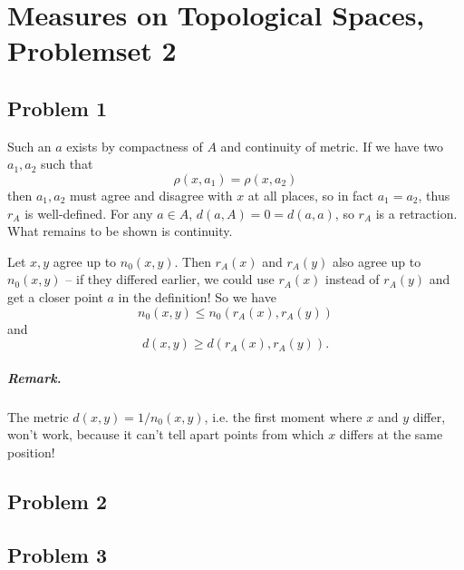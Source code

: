 \chapter{Measures on Topological Spaces, Problemset 2}

\section*{Problem 1}

Such an \( a \) exists by compactness of \( A \) and continuity of metric. If we have two \( a_1, a_2 \) such that 
\[ 
    \rho(x, a_1) = \rho(x, a_2) 
\]
then \( a_1, a_2 \) must agree and disagree with \( x \) at all places, so in fact \( a_1 = a_2 \), thus \( r_A \) is well-defined. For any \( a \in A \), \( d(a,A) = 0 = d(a,a) \), so \( r_A \) is a retraction. What remains to be shown is continuity.

Let \( x, y \) agree up to \( n_0(x,y) \). Then \( r_A(x) \) and \( r_A(y) \) also agree up to \( n_0(x,y) \) -- if they differed earlier, we could use \( r_A(x) \) instead of \( r_A(y) \) and get a closer point \( a \) in the definition! So we have
\[ 
    n_0(x, y) \leqslant n_0 \left( r_A(x), r_A(y) \right) 
\]
and
\[ 
    d(x,y) \geqslant d \left(  r_A(x), r_A(y) \right).
\]

\paragraph{Remark.} The metric \( d(x,y) = 1/n_0(x,y) \), i.e. the first moment where \( x \) and \( y \) differ, won't work, because it can't tell apart points from which \( x \) differs at the same position!

\section*{Problem 2}

\section*{Problem 3}

